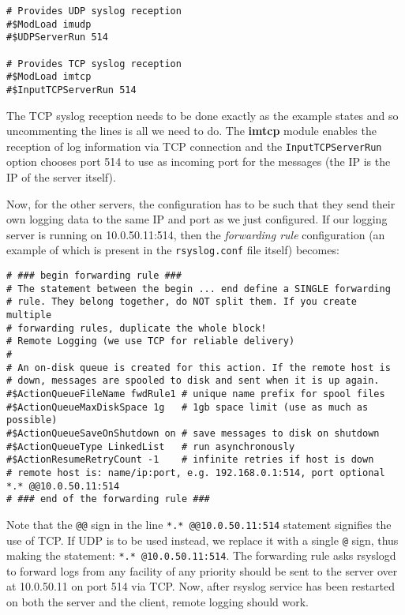 \vspace{-15pt}
\begin{verbatim}
# Provides UDP syslog reception
#$ModLoad imudp
#$UDPServerRun 514

# Provides TCP syslog reception
#$ModLoad imtcp
#$InputTCPServerRun 514
\end{verbatim}
\vspace{-10pt}	

\noindent
The TCP syslog reception needs to be done exactly as the example states and so uncommenting the lines is all we need to do. The \textbf{imtcp} module enables the reception of log information via TCP connection and the \verb|InputTCPServerRun| option chooses port 514 to use as incoming port for the messages (the IP is the IP of the server itself). 

Now, for the other servers, the configuration has to be such that they send their own logging data to the same IP and port as we just configured. If our logging server is running on 10.0.50.11:514, then the \textit{forwarding rule} configuration (an example of which is present in the \verb|rsyslog.conf| file itself) becomes:

\vspace{-15pt}
\begin{verbatim}
# ### begin forwarding rule ###
# The statement between the begin ... end define a SINGLE forwarding
# rule. They belong together, do NOT split them. If you create multiple
# forwarding rules, duplicate the whole block!
# Remote Logging (we use TCP for reliable delivery)
#
# An on-disk queue is created for this action. If the remote host is
# down, messages are spooled to disk and sent when it is up again.
#$ActionQueueFileName fwdRule1 # unique name prefix for spool files
#$ActionQueueMaxDiskSpace 1g   # 1gb space limit (use as much as possible)
#$ActionQueueSaveOnShutdown on # save messages to disk on shutdown
#$ActionQueueType LinkedList   # run asynchronously
#$ActionResumeRetryCount -1    # infinite retries if host is down
# remote host is: name/ip:port, e.g. 192.168.0.1:514, port optional
*.* @@10.0.50.11:514
# ### end of the forwarding rule ###
\end{verbatim}
\vspace{-10pt}	

\noindent
Note that the \verb|@@| sign in the line \verb|*.* @@10.0.50.11:514| statement signifies the use of TCP. If UDP is to be used instead, we replace it with a single \verb|@| sign, thus making the statement: \verb|*.* @10.0.50.11:514|. The forwarding rule asks rsyslogd to forward logs from any facility of any priority should be sent to the server over at 10.0.50.11 on port 514 via TCP. Now, after rsyslog service has been restarted on both the server and the client, remote logging should work. 

